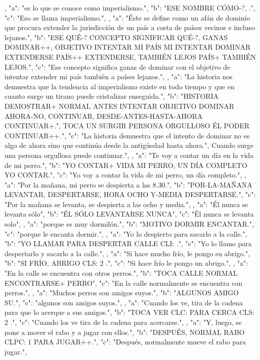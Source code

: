 ,
{
"a": "es lo que se conoce como imperialismo.",
"b": "ESE NOMBRE CÓMO-?, .",
"c": "Eso se llama imperialismo.",
}
,
{
"a": "Éste se define como un afán de dominio que procura extender la jurisdicción de un país a costa de países vecinos e incluso lejanos.",
"b": "ESE QUÉ-? CONCEPTO SIGNIFICAR QUÉ-?, GANAS DOMINAR++, OBJETIVO INTENTAR MI PAÍS MI INTENTAR DOMINAR EXTENDERSE PAÍS++ EXTENDERSE, TAMBIÉN LEJOS PAÍS+ TAMBIÉN LEJOS.",
"c": "Ese concepto significa ganas de dominar con el objetivo de intentar extender mi país también a países lejanos.",
}
,
{
"a": "La historia nos demuestra que la tendencia al imperialismo existe en todo tiempo y que en cuanto surge un tirano puede cristalizar enseguida.",
"b": "HISTORIA DEMOSTRAR+ NORMAL ANTES INTENTAR OBJETIVO DOMINAR AHORA-NO, CONTINUAR, DESDE-ANTES-HASTA-AHORA CONTINUAR+.", TOCA UN SURGIR PERSONA ORGULLOSO ÉL PODER CONTINUAR++.",
"c": "La historia demuestra que el intento de dominar no es algo de ahora sino que continúa desde la antigüedad hasta ahora.", Cuando surge una persona orgullosa puede continuar.",
}
,
{
"a": "Te voy a contar un día en la vida de mi perro.",
"b": "YO CONTAR+ VIDA MI PERRO, UN DÍA COMPLETO YO CONTAR.",
"c": "Yo voy a contar la vida de mi perro, un día completo.",
}
,
{
"a": "Por la mañana, mi perro se despierta a las 8.30.",
"b": "POR-LA-MAÑANA LEVANTAR, DESPERTARSE, HORA OCHO Y-MEDIA DESPERTARSE.",
"c": "Por la mañana se levanta, se despierta a las ocho y media.",
}
,
{
"a": "Él nunca se levanta sólo",
"b": "ÉL SÓLO LEVANTARSE NUNCA",
"c": "Él nunca se levanta solo",
}
,
{
"a": "porque es muy dormilón.",
"b": "MOTIVO DORMIR ENCANTAR.",
"c": "porque le encanta dormir.",
}
,
{
"a": "Yo lo despierto para sacarlo a la calle.",
"b": "YO LLAMAR PARA DESPERTAR CALLE CLI: .",
"c": "Yo lo llamo para despertarlo y sacarlo a la calle.",
}
,
{
"a": "Si hace mucho frío, le pongo su abrigo.",
"b": "SI FRÍO, ABRIGO CLS: 2 .",
"c": "Si hace frío le pongo un abrigo.",
}
,
{
"a": "En la calle se encuentra con otros perros.",
"b": "TOCA CALLE NORMAL ENCONTRARSE+ PERRO",
"c": "En la calle normalmente se encuentra con perros.",
}
,
{
"a": "Muchos perros son amigos suyos.",
"b": "ALGUNOS AMIGO SU.",
"c": "algunos son amigos suyos.",
}
,
{
"a": "Cuando los ve, tira de la cadena para que lo acerque a sus amigos.",
"b": "TOCA VER CLC:  PARA CERCA CLS: 2 .",
"c": "Cuando los ve tira de la cadena para acercarse.",
}
,
{
"a": "Y, luego, se pone a mover el rabo y a jugar con ellos.",
"b": "DESPUÉS, NORMAL RABO CLPC: 1  PARA JUGAR++.",
"c": "Después, normalmente mueve el rabo para jugar.",
}
